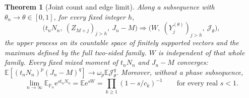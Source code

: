 \documentclass[11pt,a4paper]{article}
\numberwithin{equation}{section}
\newtheorem{theorem}{Theorem}[section]
\theoremstyle{definition}
\theoremstyle{remark}
\newcommand{\e}{\mathrm e}
\newcommand{\PP}{\mathbb P}
\newcommand{\E}{\mathbb E}
\newcommand{\Jl}{\mathcal J}
\begin{document}
\begin{theorem}[Joint count and edge limit]\label{ctp:cl:thm:joint}
Along a subsequence with $\theta_n\to\theta\in[0,1]$, for every fixed
integer $h$,
\begin{equation}\label{ctp:cl:eq:joint}
 \bigl(t_nN_n,\ (Z_{M+j})_{j>h},\ J_n-M\bigr)\Rightarrow
 \bigl(W,\ (Y_j^{(\theta)})_{j>h},\ \Jl_\theta\bigr),
\end{equation}
the upper process on its countable space of finitely supported vectors and
the maximum defined by the full two-sided family. $W$ is independent of that
whole family. Every fixed mixed moment of $t_nN_n$ and $J_n-M$ converges:
$\E[(t_nN_n)^p(J_n-M)^q]\to\omega_p\E\Jl_\theta^q$. Moreover, without a
phase subsequence,
\begin{equation}\label{ctp:cl:eq:mgf}
 \lim_{n\to\infty}\E_{\PP_n}\e^{st_nN_n}=\E\e^{sW}=\prod_{k\ge1}(1-s/c_k)^{-1}
 \qquad\text{for every real }s<1.
\end{equation}
\end{theorem}
\end{document}
